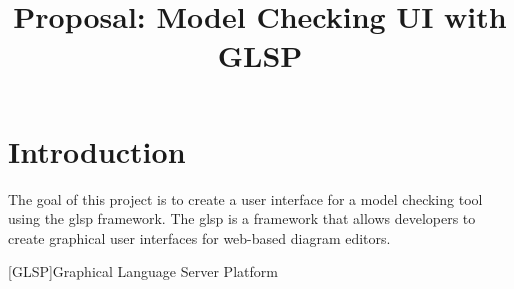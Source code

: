 \documentclass[conference]{IEEEtran}
\begin{document}
  \title{Proposal: Model Checking UI with GLSP}

  \author{
    }

  \maketitle

  \IEEEpeerreviewmaketitle

  \section{Introduction}
  \label{sec:introduction}
  The goal of this project is to create a user interface for a model checking tool using the \ac{glsp} framework. The \ac{glsp} is a framework that allows developers to create graphical user interfaces for web-based diagram editors. \cite{glsp-repo}


  \printbibliography

  \begin{acronym}
    [GLSP]{Graphical Language Server Platform}
  \end{acronym}
\end{document}
